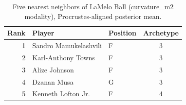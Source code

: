 \begin{table}[htbp]
  \centering\small
  \begin{tabular}{rllc}
    \toprule
    Rank & Player & Position & Archetype \\
    \midrule
    1 & Sandro Mamukelashvili & F & 3 \\
    2 & Karl-Anthony Towns & F & 3 \\
    3 & Alize Johnson & F & 3 \\
    4 & Dzanan Musa & G & 3 \\
    5 & Kenneth Lofton Jr. & F & 4 \\
    \bottomrule
  \end{tabular}
  \caption{Five nearest neighbors of LaMelo Ball (curvature_m2 modality), Procrustes-aligned posterior mean.}
  \label{tab:LaMelo_Ball_neighbors_curvature_m2}
\end{table}

